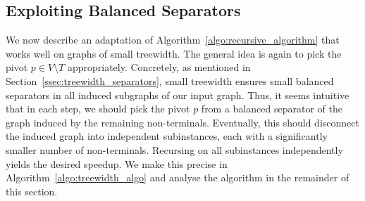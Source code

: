 \documentclass[a4paper,UKenglish,cleveref, autoref, thm-restate]{lipics-v2021}
\begin{document}
\subsection{Exploiting Balanced Separators}
\label{ssec:exploiting_balanced_separators}

We now describe an adaptation of 
Algorithm~\ref{algo:recursive_algorithm} that works well on graphs of small treewidth. The general idea is again to pick the pivot $p \in V \setminus T$ appropriately. Concretely, as mentioned in Section~\ref{ssec:treewidth_separators}, small treewidth ensures small balanced separators in all induced subgraphs of our input graph. Thus, it seems intuitive that in each step, we should pick the pivot $p$ from a balanced separator of the graph induced by the remaining non-terminals. Eventually, this should disconnect the induced graph into independent subinstances, each with a significantly smaller number of non-terminals. Recursing on all subinstances independently yields the desired speedup. We make this precise in Algorithm~\ref{algo:treewidth_algo} and analyse the algorithm in the remainder of this section.
\end{document}
